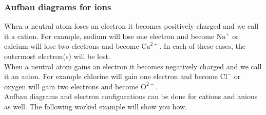 \subsubsection*{Aufbau diagrams for ions}
When a neutral atom loses an electron it becomes positively charged and we call it a cation. For example, sodium will lose one electron and become $\text{Na}^{+}$ or calcium will lose two electrons and become $\text{Ca}^{2+}$. In each of these cases, the outermost electron(s) will be lost. \\
When a neutral atom gains an electron it becomes negatively charged and we call it an anion. For example chlorine will gain one electron and become $\text{Cl}^{-}$ or oxygen will gain two electrons and become $\text{O}^{2-}$.  \\
Aufbau diagrams and electron configurations can be done for cations and anions as well. The following worked example will show you how. \\
